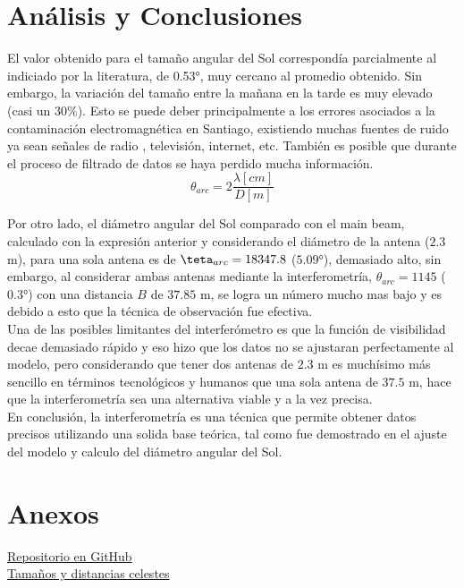 \documentclass[letterpaper,oneside]{article}
\begin{document}
\section{Análisis y Conclusiones}
El valor obtenido para el tamaño angular del Sol correspondía parcialmente al indiciado por la literatura, de 0.53°, muy cercano al promedio obtenido. Sin embargo, la variación del tamaño entre la mañana en la tarde es muy elevado (casi un $30\%$). Esto se puede deber principalmente a los errores asociados a la contaminación electromagnética en Santiago, existiendo muchas fuentes de ruido ya sean señales de radio , televisión, internet, etc. También es posible que durante el proceso de filtrado de datos se haya perdido mucha información.\\

$$\theta_{arc} = 2 \frac{\lambda [cm]}{D [m]}$$

Por otro lado, el diámetro angular del Sol comparado con el main beam, calculado con la expresión anterior y considerando el diámetro de la antena ($2.3$ m), para una sola antena es de $\teta_{arc} = 18347.8$ ($5.09°$), demasiado alto, sin embargo, al considerar ambas antenas mediante la interferometría, $\theta_{arc} = 1145$ ($0.3°$) con una distancia $B$ de $37.85$ m, se logra un número mucho mas bajo y es debido a esto que la técnica de observación fue efectiva.\\

Una de las posibles limitantes del interferómetro es que la función de visibilidad decae demasiado rápido y eso hizo que los datos no se ajustaran perfectamente al modelo, pero considerando que tener dos antenas de $2.3$ m es muchísimo más sencillo en términos tecnológicos y humanos que una sola antena de $37.5$ m, hace que la interferometría sea una alternativa viable y a la vez precisa.\\

En conclusión, la interferometría es una técnica que permite obtener datos precisos utilizando una solida base teórica, tal como fue demostrado en el ajuste del modelo y calculo del diámetro angular del Sol.\\
 
\section{Anexos}
\href{https://github.com/vecheto/astro_experimental/tree/main/Tarea\%204}{Repositorio en GitHub}\\
\href{https://www.matem.unam.mx/~barot/clases/2012-2/24medicion.pdf}{Tamaños y distancias celestes}\\
\end{document}
